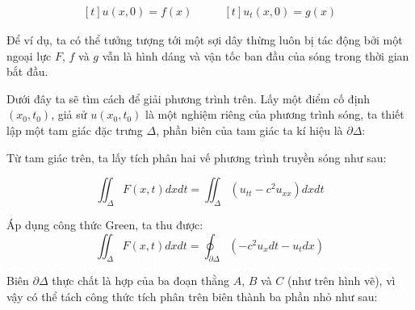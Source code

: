 \documentclass[a4paper]{article}
\begin{document}
\begin{equation*}
\begin{aligned}[t]
u(x,0) = f(x)
\end{aligned}
\qquad
\begin{aligned}[t]
u_t(x, 0) = g(x)
\end{aligned}
\end{equation*}

Để ví dụ, ta có thể tưởng tượng tới một sợi dây thừng luôn bị tác động bởi một ngoại lực $F$, $f$ và $g$ vẫn là hình dáng và vận tốc ban đầu của sóng trong thời gian bắt đầu.

Dưới đây ta sẽ tìm cách để giải phương trình trên. Lấy một điểm cố định $(x_0, t_0)$, giả sử $u(x_0, t_0)$ là một nghiệm riêng của phương trình sóng, ta thiết lập một tam giác đặc trưng $\Delta$, phần biên của tam giác ta kí hiệu là $\partial \Delta$:

\begin{center} 
\end{center}

Từ tam giác trên, ta lấy tích phân hai vế phương trình truyền sóng như sau:

\begin{equation*}
    \iint_{\Delta} F(x, t)dxdt = \iint_{\Delta} (u_{tt} - c^2u_{xx})dxdt
\end{equation*}

Áp dụng công thức Green, ta thu được:
\begin{equation*}
    \iint_{\Delta} F(x, t)dxdt = \oint_{\partial \Delta} (-c^2u_x dt - u_t dx)
\end{equation*}

Biên $\partial \Delta$ thực chất là hợp của ba đoạn thằng $A$, $B$ và $C$ (như trên hình vẽ), vì vậy có thể tách công thức tích phân trên biên thành ba phần nhỏ như sau:
\end{document}
